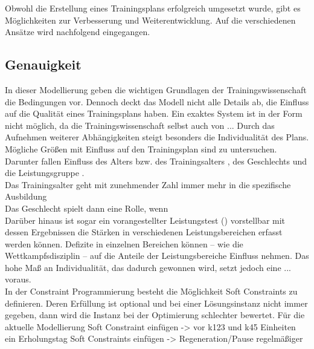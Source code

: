 Obwohl die Erstellung eines Trainingsplans erfolgreich umgesetzt wurde, gibt es Möglichkeiten zur Verbesserung und Weiterentwicklung. Auf die verschiedenen Ansätze wird nachfolgend eingegangen.

\subsection{Genauigkeit}
In dieser Modellierung geben die wichtigen Grundlagen der Trainingswissenschaft die Bedingungen vor. Dennoch deckt das Modell nicht alle Details ab, die Einfluss auf die Qualität eines Trainingsplans haben. Ein exaktes System ist in der Form nicht möglich, da die Trainingswissenschaft selbst auch von ... 
Durch das Aufnehmen weiterer Abhängigkeiten steigt besonders die Individualität des Plans. Mögliche Größen mit Einfluss auf den Trainingsplan sind zu untersuchen. Darunter fallen Einfluss des Alters bzw. des Trainingsalters \cite[181]{EinfuerungTrainingswissenschaft}, des Geschlechts und die Leistungsgruppe \cite[S. 173]{Radsporttraining}. \\
Das Trainingsalter geht mit zunehmender Zahl immer mehr in die spezifische Ausbildung \\
Das Geschlecht spielt dann eine Rolle, wenn \\
Darüber hinaus ist sogar ein vorangestellter Leistungstest () vorstellbar mit dessen Ergebnissen die Stärken in verschiedenen Leistungsbereichen erfasst werden können. Defizite in einzelnen Bereichen können --  wie die Wettkampfsdisziplin -- auf die Anteile der Leistungsbereiche Einfluss nehmen. Das hohe Maß an Individualität, das dadurch gewonnen wird, setzt jedoch eine ... voraus. \\
In der Constraint Programmierung besteht die Möglichkeit Soft Constraints zu definieren. Deren Erfüllung ist optional und bei einer Lösungsinstanz nicht immer gegeben, dann wird die Instanz bei der Optimierung schlechter bewertet. Für die aktuelle Modellierung 
Soft Constraint einfügen -> vor k123 und k45 Einheiten ein Erholungstag
Soft Constraints einfügen -> Regeneration/Pause regelmäßiger
   

